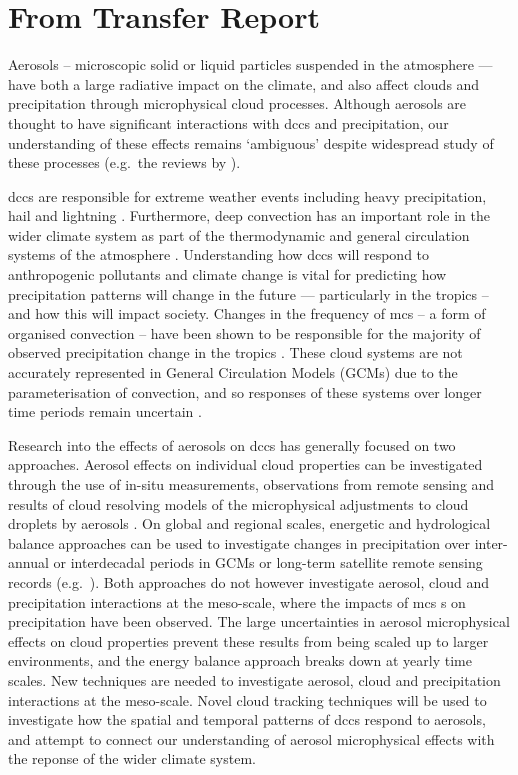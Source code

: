 \section{From Transfer Report}

Aerosols – microscopic solid or liquid particles suspended in the atmosphere --- have both a large radiative  impact on the climate, and also affect clouds and precipitation through microphysical cloud processes. 
Although aerosols are thought to have significant interactions with \acrshort{dcc}s and precipitation, our understanding of these effects remains ‘ambiguous’ \citep{IPCCCloudsAeorosolsBoucher2013} despite widespread study of these processes (e.g.\ the reviews by \citet{levin_aerosol_2008, tao_impact_2012, fan_review_2016}).

\acrshort{dcc}s are responsible for extreme weather events including heavy precipitation, hail and lightning \citep{westra_future_2014}. Furthermore, deep convection has an important role in the wider climate system as part of the thermodynamic and general circulation systems of the atmosphere \citep{weisman_mesoscale_2015}. Understanding how \acrshort{dcc}s will respond to anthropogenic pollutants and climate change is vital for predicting how precipitation patterns will change in the future --- particularly in the tropics – and how this will impact society. 
Changes in the frequency of \acrshort{mcs} – a form of organised convection – have been shown to be responsible for the majority of observed precipitation change in the tropics \citep{tan_increases_2015}. 
These cloud systems are not accurately represented in General Circulation Models (GCMs) due to the parameterisation of convection, and so responses of these systems over longer time periods remain uncertain \citep{ogorman_precipitation_2015}.

Research into the effects of aerosols on \acrshort{dcc}s has generally focused on two approaches. Aerosol effects on individual cloud properties can be investigated through the use of in-situ measurements, observations from remote sensing and results of cloud resolving models of the microphysical adjustments to cloud droplets by aerosols \citep{khain2005aerosol}. 
On global and regional scales, energetic and hydrological balance approaches can be used to investigate changes in precipitation over inter-annual or interdecadal periods in GCMs or long-term satellite remote sensing records (e.g.\ \citet{allen_constraints_2002, held_robust_2006, muller_energetic_2011, richardson_drivers_2018}). 
Both approaches do not however investigate aerosol, cloud and precipitation interactions at the meso-scale, where the impacts of \acrshort{mcs} s on precipitation have been observed. 
The large uncertainties in aerosol microphysical effects on cloud properties prevent these results from being scaled up to larger environments, and the energy balance approach breaks down at yearly time scales. 
New techniques are needed to investigate aerosol, cloud and precipitation interactions at the meso-scale. 
Novel cloud tracking techniques will be used to investigate how the spatial and temporal patterns of \acrshort{dcc}s respond to aerosols, and attempt to connect our understanding of aerosol microphysical effects with the reponse of the wider climate system.

